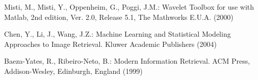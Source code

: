 \documentclass[a4paper]{llncs}
\begin{document}
\begin{thebibliography}{88}
Misti, M., Misti, Y., Oppenheim, G., Poggi, J.M.: Wavelet Toolbox for use with Matlab, 2nd edition, Ver. 2.0, Release 5.1, The Mathworks E.U.A. (2000)

Chen, Y., Li, J., Wang, J.Z.: Machine Learning and Statistical Modeling Approaches to Image Retrieval. Kluwer Academic Publishers (2004)

Baeza-Yates, R., Ribeiro-Neto, B.: Modern Information Retrieval. ACM Press, Addison-Wesley, Edinburgh, England (1999)
%
%
%

%
%
\end{thebibliography}
\end{document}
